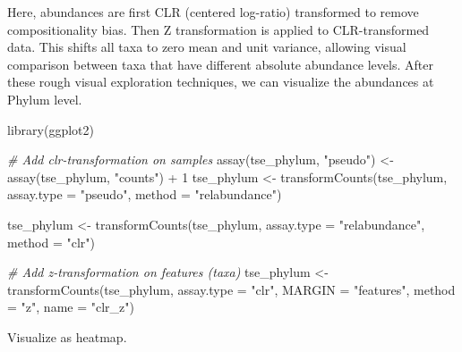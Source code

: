 \documentclass[
]{book}
\newenvironment{Shaded}{\begin{snugshade}}{\end{snugshade}}
\newcommand{\AttributeTok}[1]{\textcolor[rgb]{0.77,0.63,0.00}{#1}}
\newcommand{\CommentTok}[1]{\textcolor[rgb]{0.56,0.35,0.01}{\textit{#1}}}
\newcommand{\DecValTok}[1]{\textcolor[rgb]{0.00,0.00,0.81}{#1}}
\newcommand{\FunctionTok}[1]{\textcolor[rgb]{0.00,0.00,0.00}{#1}}
\newcommand{\NormalTok}[1]{#1}
\newcommand{\OtherTok}[1]{\textcolor[rgb]{0.56,0.35,0.01}{#1}}
\newcommand{\SpecialCharTok}[1]{\textcolor[rgb]{0.00,0.00,0.00}{#1}}
\newcommand{\StringTok}[1]{\textcolor[rgb]{0.31,0.60,0.02}{#1}}
\begin{document}
Here, abundances are first CLR (centered log-ratio) transformed to
remove compositionality bias. Then Z transformation is applied to
CLR-transformed data. This shifts all taxa to zero mean and unit
variance, allowing visual comparison between taxa that have different
absolute abundance levels. After these rough visual exploration
techniques, we can visualize the abundances at Phylum level.

\begin{Shaded}
\begin{Highlighting}[]
\FunctionTok{library}\NormalTok{(ggplot2)}

\CommentTok{\# Add clr{-}transformation on samples}
\FunctionTok{assay}\NormalTok{(tse\_phylum, }\StringTok{"pseudo"}\NormalTok{) }\OtherTok{\textless{}{-}} \FunctionTok{assay}\NormalTok{(tse\_phylum, }\StringTok{"counts"}\NormalTok{) }\SpecialCharTok{+} \DecValTok{1}
\NormalTok{tse\_phylum }\OtherTok{\textless{}{-}} \FunctionTok{transformCounts}\NormalTok{(tse\_phylum, }\AttributeTok{assay.type =} \StringTok{"pseudo"}\NormalTok{,}
                              \AttributeTok{method =} \StringTok{"relabundance"}\NormalTok{)}

\NormalTok{tse\_phylum }\OtherTok{\textless{}{-}} \FunctionTok{transformCounts}\NormalTok{(tse\_phylum,}
                  \AttributeTok{assay.type =} \StringTok{"relabundance"}\NormalTok{,}
          \AttributeTok{method =} \StringTok{"clr"}\NormalTok{)}

\CommentTok{\# Add z{-}transformation on features (taxa)}
\NormalTok{tse\_phylum }\OtherTok{\textless{}{-}} \FunctionTok{transformCounts}\NormalTok{(tse\_phylum, }\AttributeTok{assay.type =} \StringTok{"clr"}\NormalTok{, }
                              \AttributeTok{MARGIN =} \StringTok{"features"}\NormalTok{,}
                              \AttributeTok{method =} \StringTok{"z"}\NormalTok{, }\AttributeTok{name =} \StringTok{"clr\_z"}\NormalTok{)}
\end{Highlighting}
\end{Shaded}

Visualize as heatmap.
\end{document}
